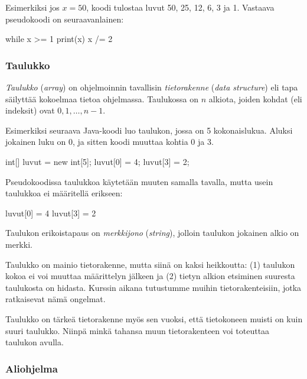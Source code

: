 Esimerkiksi jos $x=50$, koodi tulostaa luvut 50, 25, 12, 6, 3 ja 1.
Vastaava pseudokoodi on seuraavanlainen:

\begin{code}
while x >= 1
    print(x)
    x /= 2
\end{code}

\subsubsection{Taulukko}


\emph{Taulukko} (\emph{array}) on ohjelmoinnin tavallisin \emph{tietorakenne}
(\emph{data structure})
eli tapa säilyttää kokoelmaa tietoa ohjelmassa.
Taulukossa on $n$ alkiota, joiden kohdat (eli indeksit) ovat $0,1,\dots,n-1$.

Esimerkiksi seuraava Java-koodi luo taulukon,
jossa on 5 kokonaislukua. Aluksi jokainen luku on 0,
ja sitten koodi muuttaa kohtia 0 ja 3.

\begin{code}
int[] luvut = new int[5];
luvut[0] = 4;
luvut[3] = 2;
\end{code}

Pseudokoodissa taulukkoa käytetään muuten samalla tavalla,
mutta usein taulukkoa ei määritellä erikseen:

\begin{code}
luvut[0] = 4
luvut[3] = 2
\end{code}

Taulukon erikoistapaus on \emph{merkkijono} (\emph{string}),
jolloin taulukon jokainen alkio on merkki.

Taulukko on mainio tietorakenne, mutta siinä on kaksi heikkoutta:
(1) taulukon kokoa ei voi muuttaa määrittelyn jälkeen ja
(2) tietyn alkion etsiminen suuresta taulukosta on hidasta.
Kurssin aikana tutustumme muihin tietorakenteisiin,
jotka ratkaisevat nämä ongelmat.

Taulukko on tärkeä tietorakenne myös sen vuoksi,
että tietokoneen muisti on kuin suuri taulukko.
Niinpä minkä tahansa muun tietorakenteen voi toteuttaa
taulukon avulla.

\subsubsection{Aliohjelma}


